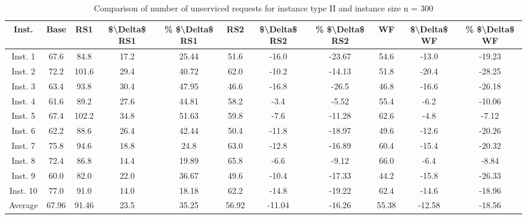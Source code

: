 \begin{table}[H]
\centering
\begin{tabular}{ccccccccccc}
  \hline
  \textbf{Inst.} & \textbf{Base} & \textbf{RS1} & \textbf{\$\textbackslash{}Delta\$  RS1} & \textbf{\% \$\textbackslash{}Delta\$  RS1} & \textbf{RS2} & \textbf{\$\textbackslash{}Delta\$  RS2} & \textbf{\% \$\textbackslash{}Delta\$  RS2} & \textbf{WF} & \textbf{\$\textbackslash{}Delta\$  WF} & \textbf{\% \$\textbackslash{}Delta\$  WF} \\\hline
  Inst. 1 & 67.6 & 84.8 & 17.2 & 25.44 & 51.6 & -16.0 & -23.67 & 54.6 & -13.0 & -19.23 \\
  Inst. 2 & 72.2 & 101.6 & 29.4 & 40.72 & 62.0 & -10.2 & -14.13 & 51.8 & -20.4 & -28.25 \\
  Inst. 3 & 63.4 & 93.8 & 30.4 & 47.95 & 46.6 & -16.8 & -26.5 & 46.8 & -16.6 & -26.18 \\
  Inst. 4 & 61.6 & 89.2 & 27.6 & 44.81 & 58.2 & -3.4 & -5.52 & 55.4 & -6.2 & -10.06 \\
  Inst. 5 & 67.4 & 102.2 & 34.8 & 51.63 & 59.8 & -7.6 & -11.28 & 62.6 & -4.8 & -7.12 \\
  Inst. 6 & 62.2 & 88.6 & 26.4 & 42.44 & 50.4 & -11.8 & -18.97 & 49.6 & -12.6 & -20.26 \\
  Inst. 7 & 75.8 & 94.6 & 18.8 & 24.8 & 63.0 & -12.8 & -16.89 & 60.4 & -15.4 & -20.32 \\
  Inst. 8 & 72.4 & 86.8 & 14.4 & 19.89 & 65.8 & -6.6 & -9.12 & 66.0 & -6.4 & -8.84 \\
  Inst. 9 & 60.0 & 82.0 & 22.0 & 36.67 & 49.6 & -10.4 & -17.33 & 44.2 & -15.8 & -26.33 \\
  Inst. 10 & 77.0 & 91.0 & 14.0 & 18.18 & 62.2 & -14.8 & -19.22 & 62.4 & -14.6 & -18.96 \\
  Average & 67.96 & 91.46 & 23.5 & 35.25 & 56.92 & -11.04 & -16.26 & 55.38 & -12.58 & -18.56 \\\hline
\end{tabular}
\caption{Comparison of number of unserviced requests for instance type II and instance size n = 300}
\label{tab:wait:resrelocation-nTaxi-comparison_II_300}
\end{table}
